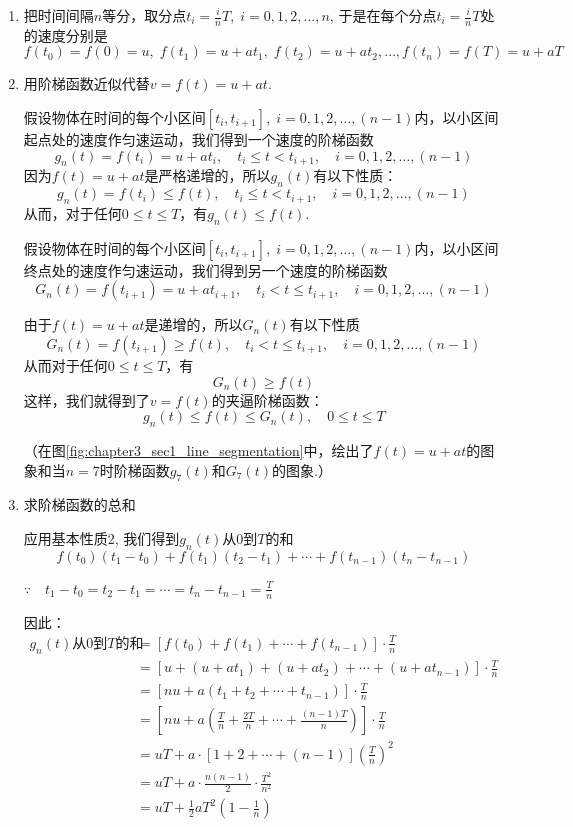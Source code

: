 \begin{solution}
\begin{enumerate}
    \item 把时间间隔$n$等分，取分点$t_i=\frac{i}{n}T,\; i=0,1, 2,\ldots,n$, 于是在每个分点$t_i=\frac{i}{n}T$处的速度分别是
\[f (t_0) =f (0) =u,\;  f(t_1) =u+at_1,\; f (t_2) =u+at_2,\ldots,f (t_n) =f (T) =u+aT\]
\item 用阶梯函数近似代替$v=f(t)=u+at$. 

假设物体在时间的每个小区间$[t_i,t_{i+1}],\; i=0,1, 2,\ldots,(n-1)$内，以小区间起点处的速度作匀速运动，我们得到一个速度的阶梯函数
\[g_n (t)=f(t_i)=u+at_i,\quad t_i\le t<t_{i+1},\quad i=0,1,2,\ldots,(n-1)\]
因为$f(t)=u+at$是严格递增的，所以$g_n(t)$有以下性质：
\[g_n (t)=f(t_i)\le f(t),\quad t_i\le t<t_{i+1},\quad i=0,1,2,\ldots,(n-1)\]
从而，对于任何$0\le t\le T$，有$g_n(t)\le f(t)$.

假设物体在时间的每个小区间$[t_i,t_{i+1}],\; i=0,1, 2,\ldots,(n-1)$内，以小区间终点处的速度作匀速运动，我们得到另一个速度的阶梯函数
\[G_n(t)=f(t_{i+1})=u+at_{i+1},\quad t_i< t\le t_{i+1},\quad i=0,1,2,\ldots,(n-1)\]

由于$f(t)=u+at$是递增的，所以$G_n(t)$有以下性质
\[G_n (t)=f(t_{i+1})\ge f(t),\quad t_i< t\le t_{i+1},\quad i=0,1,2,\ldots,(n-1)\]
从而对于任何$0\le t\le T$，有
\[G_n(t)\ge f(t)\]
这样，我们就得到了$v=f(t)$的夹逼阶梯函数：
\[ g_n(t) \le f (t) \le G_n (t),\quad 0\le t\le T\]

（在图\ref{fig:chapter3_sec1_line_segmentation}中，绘出了$f(t)=u+at$的图象和当$n=7$时阶梯函数$g_7(t)$和$G_7(t)$的图象.）

\item 求阶梯函数的总和

应用基本性质2, 我们得到$g_n(t)$从0到$T$的和
\[f(t_0)(t_1-t_0)+f(t_1)(t_2-t_1)+\cdots+f (t_{n-1}) (t_n-t_{n-1})\]

$\because\quad t_1-t_0=t_2-t_1=\cdots=t_n-t_{n-1}=\frac{T}{n}$

因此：
\begin{align*}
\text{$g_n(t)$从0到$T$的和}&=\left[f(t_0)+f(t_1)+\cdots+f(t_{n-1})\right]\cdot \frac{T}{n}\\
&=\left[u+(u+at_1)+(u+at_2)+\cdots +(u+at_{n-1})\right]\cdot \frac{T}{n}\\
&=\left[nu+a(t_1+t_2+\cdots+t_{n-1})\right]\cdot \frac{T}{n}\\
&=\left[nu+a\left(\frac{T}{n}+\frac{2T}{n}+\cdots+\frac{(n-1)T}{n}\right)\right]\cdot \frac{T}{n}\\
&=uT+a\cdot [1+2+\cdots+(n-1)]\left(\frac{T}{n}\right)^2\\
&=uT+a\cdot \frac{n(n-1)}{2}\cdot \frac{T^2}{n^2}\\
&=uT+\frac{1}{2}aT^2\left(1-\frac{1}{n}\right)
\end{align*}


\end{enumerate}
\end{solution}
